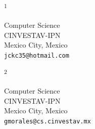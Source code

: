 \documentclass{article}
\newcommand{\ADDRESS}[2]{\noindent
  \textsuperscript{#1}\parbox[t]{0.9\textwidth}{#2} \vspace{6pt}}
\begin{document}
\vspace{1cm}

\ADDRESS{1}{
Computer Science  \\ CINVESTAV-IPN \\
Mexico City, Mexico \\
\texttt{jckc35@hotmail.com}
}

\vspace{.5cm}

\ADDRESS{2}{
Computer Science  \\ CINVESTAV-IPN \\
Mexico City, Mexico \\
\texttt{gmorales@cs.cinvestav.mx}
}
\end{document}
